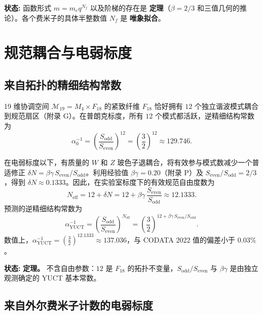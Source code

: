 \documentclass[12pt,a4paper]{article}
\begin{document}
	\textbf{状态:} 函数形式 \(m = m_e q^{N_f}\) 以及阶梯的存在是 \textbf{定理}（\(\beta = 2/3\) 和三值几何的推论）。各个费米子的具体半整数值 \(N_f\) 是 \textbf{唯象拟合}。
	
	\section{规范耦合与电弱标度}
	\label{sec:gauge}
	
	\subsection{来自拓扑的精细结构常数}
	
	19 维协调空间 \(\mathcal{M}_{19}=M_4\times F_{18}\) 的紧致纤维 \(F_{18}\) 恰好拥有 \(12\) 个独立谐波模式耦合到规范扇区（附录 G）。在普朗克标度，所有 \(12\) 个模式都活跃，逆精细结构常数为
	\begin{equation}
		\alpha_0^{-1} = \left(\frac{S_{\mathrm{odd}}}{S_{\mathrm{even}}}\right)^{12}
		= \left(\frac{3}{2}\right)^{12} \approx 129.746 .
	\end{equation}
	
	在电弱标度以下，有质量的 \(W\) 和 \(Z\) 玻色子退耦合，将有效参与模式数减少一个普适修正 \(\delta N = \beta\gamma \, S_{\mathrm{even}}/S_{\mathrm{odd}}\)。利用经验值 \(\beta\gamma = 0.20\)（附录 P）及 \(S_{\mathrm{even}}/S_{\mathrm{odd}} = 2/3\)，得到 \(\delta N \approx 0.1333\)。因此，在实验室标度下的有效规范自由度数为
	\begin{equation}
		N_{\mathrm{eff}} = 12 + \delta N = 12 + \beta\gamma\,\frac{S_{\mathrm{even}}}{S_{\mathrm{odd}}} \approx 12.1333 .
	\end{equation}
	预测的逆精细结构常数为
	\begin{equation}
		\boxed{\alpha^{-1}_{\mathrm{YUCT}} =
			\left(\frac{S_{\mathrm{odd}}}{S_{\mathrm{even}}}\right)^{N_{\mathrm{eff}}}
			= \left(\frac{3}{2}\right)^{12 + \beta\gamma\,S_{\mathrm{even}}/S_{\mathrm{odd}}} } .
		\label{eq:alpha-yuct}
	\end{equation}
	数值上，\(\alpha^{-1}_{\mathrm{YUCT}} = \left(\frac{3}{2}\right)^{12.1333} \approx 137.036\)，与 CODATA 2022 值的偏差小于 \(0.03\%\)。
	
	\textbf{状态:} \textbf{定理。} 不含自由参数：\(12\) 是 \(F_{18}\) 的拓扑不变量，\(S_{\mathrm{odd}}/S_{\mathrm{even}}\) 与 \(\beta\gamma\) 是由独立观测确定的 YUCT 基本常数。
	
	\subsection{来自外尔费米子计数的电弱标度}
	
\end{document}
